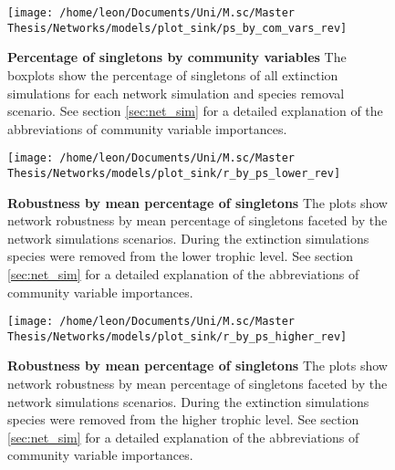 \documentclass[12pt,a4paper]{article}
\begin{document}
\begin{figure}[H]
	 \centering
	 \texttt{[image: /home/leon/Documents/Uni/M.sc/Master Thesis/Networks/models/plot\_sink/ps\_by\_com\_vars\_rev]}
	 	 \captionsetup{width = .8\textwidth}
	 \caption[Percentage of singletons by community variables]{\textbf{Percentage of singletons by community variables} The boxplots show the percentage of singletons of all extinction simulations for each network simulation and species removal scenario. See section \ref{sec:net_sim} for a detailed explanation of the abbreviations of community variable importances.}
	 \label{fig:ps_by_cv}
\end{figure}

\begin{figure}[H]
	 \centering
	 \texttt{[image: /home/leon/Documents/Uni/M.sc/Master Thesis/Networks/models/plot\_sink/r\_by\_ps\_lower\_rev]}
	 \captionsetup{width = .8\textwidth}
	 \caption[Robustness by mean percentage of singletons under lower level species loss]{\textbf{Robustness by mean percentage of singletons} The plots show network robustness by mean percentage of singletons faceted by the network simulations scenarios. During the extinction simulations species were removed from the lower trophic level. See section \ref{sec:net_sim} for a detailed explanation of the abbreviations of community variable importances.}
	 \label{fig:r_by_ps_lower}
\end{figure}

\begin{figure}[H]
	 \centering
	 \texttt{[image: /home/leon/Documents/Uni/M.sc/Master Thesis/Networks/models/plot\_sink/r\_by\_ps\_higher\_rev]}
	 	 \captionsetup{width = .8\textwidth}
	 \caption[Robustness by mean percentage of singletons under higher level species loss]{\textbf{Robustness by mean percentage of singletons} The plots show network robustness by mean percentage of singletons faceted by the network simulations scenarios. During the extinction simulations species were removed from the higher trophic level. See section \ref{sec:net_sim} for a detailed explanation of the abbreviations of community variable importances.}
	 \label{fig:r_by_ps_higher}
\end{figure}


\end{document}

